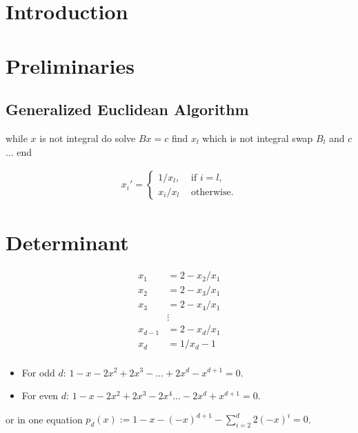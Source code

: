 \documentclass[english,version-2020-11]{uzl-thesis}
\begin{document}
\chapter{Introduction}

\chapter{Preliminaries}

\section{Generalized Euclidean Algorithm}

\begin{Pseudocode}
while $x$ is not integral do
  solve $Bx = c$
  find $x_l$ which is not integral
  swap $B_l$ and $c$
  ...
end
\end{Pseudocode}

\begin{align*}
  x_i' = \begin{cases}
    1 / x_l, & \text{ if } i = l, \\
    x_i / x_l & \text{ otherwise.}
  \end{cases}
\end{align*}

\chapter{Determinant}

\begin{align*}
  x_1     & = 2 - x_2 / x_1 \\
  x_2     & = 2 - x_3 / x_1 \\
  x_3     & = 2 - x_4 / x_1 \\
          & \vdots          \\
  x_{d-1} & = 2 - x_d / x_1 \\
  x_d     & = 1 / x_d - 1   \\
\end{align*}

\begin{itemize}
  \item For odd $d$: $1 - x - 2 x^2 + 2 x^3 - \dots + 2 x^d - x^{d+1} = 0$.
  \item For even $d$: $1 - x - 2 x^2 + 2 x^3 - 2 x^4 \dots - 2 x^d + x^{d+1} = 0$.
\end{itemize}
or in one equation $p_d(x) := 1 - x - (-x)^{d+1} - \sum_{i = 2}^{d} 2 (-x)^{i} = 0$.
\end{document}
